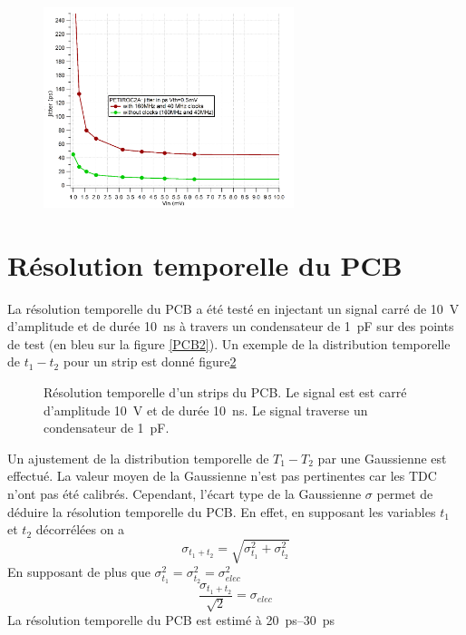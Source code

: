\begin{figure}[ht!]
	\centering
	\includegraphics[width=0.65\textwidth]{ELE/Jitter.png}
	\label{jitter}
\end{figure}

\vspace{0.4cm}
\section{Résolution temporelle du PCB}
La résolution temporelle du PCB a été testé en injectant un signal carré de \SI{10}{\volt} d'amplitude et de durée \SI{10}{\nano\second} à travers un condensateur de \SI{1}{\pico\farad} sur des points de test (en bleu sur la figure \ref{PCB2}). Un exemple de la distribution temporelle de $t_{1}-t_{2}$ pour un strip est donné figure\ref{RESOLUTION}

\begin{figure}[!ht]
	\centering
	\caption{Résolution temporelle d'un strips du PCB. Le signal est est carré d'amplitude \SI{10}{\volt} et de durée \SI{10}{\nano\second}. Le signal traverse un condensateur de \SI{1}{\pico\farad}.}
	\label{RESOLUTION}
\end{figure}

Un ajustement de la distribution temporelle de $T_{1}-T_{2}$ par une Gaussienne est effectué. La valeur moyen de la Gaussienne n'est pas pertinentes car les TDC n'ont pas été calibrés. Cependant, l'écart type de la Gaussienne $\sigma$ permet de déduire la résolution temporelle du PCB. En effet, en supposant les variables $t_1$ et $t_2$ décorrélées on a
\begin{equation}
\sigma_{t_1+t_2}=\sqrt{\sigma_{t_1}^2+\sigma_{t_2}^2}
\end{equation}
En supposant de plus que $\sigma_{t_1}^2=\sigma_{t_2}^2=\sigma_{elec}^2$
\begin{equation}
\frac{\sigma_{t_1+t_2}}{\sqrt{2}}=\sigma_{elec}
\end{equation}
La résolution temporelle du PCB est estimé à \SIrange{20}{30}{\pico\second}

